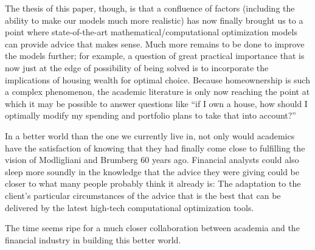 \documentclass{article}
\begin{document}
The thesis of this paper, though, is that a confluence of factors (including the ability to make our models much more realistic) has now finally brought us to a point where state-of-the-art mathematical/computational optimization models can provide advice that makes sense. Much more remains to be done to improve the models further; for example, a question of great practical importance that is now just at the edge of possibility of being solved is to incorporate the implications of housing wealth for optimal choice. Because homeownership is such a complex phenomenon, the academic literature is only now reaching the point at which it may be possible to answer questions like ``if I own a house, how should I optimally modify my spending and portfolio plans to take that into account?''

In a better world than the one we currently live in, not only would academics have the satisfaction of knowing that they had finally come close to fulfilling the vision of Modligliani and Brumberg 60 years ago. Financial analysts could also sleep more soundly in the knowledge that the advice they were giving could be closer to what many people probably think it already is: The adaptation to the client's particular circumstances of the advice that is the best that can be delivered by the latest high-tech computational optimization tools.

The time seems ripe for a much closer collaboration between academia and the financial industry in building this better world.





\end{document}
